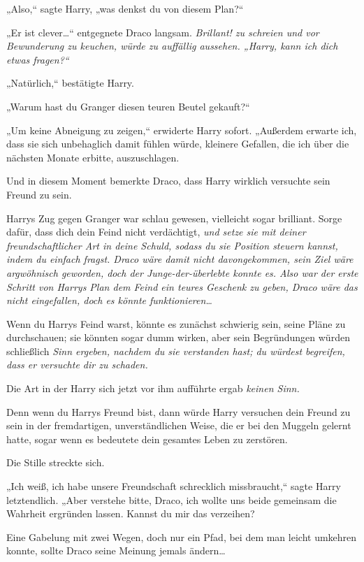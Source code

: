 {„Also,“ sagte Harry, „was denkst du von diesem Plan?“

„Er ist clever…“ entgegnete Draco langsam. \emph{Brillant! zu schreien und vor Bewunderung zu keuchen, würde zu auffällig aussehen. „Harry, kann ich dich etwas fragen?“}

„Natürlich,“ bestätigte Harry.

„Warum hast du Granger diesen teuren Beutel gekauft?“

„Um keine Abneigung zu zeigen,“ erwiderte Harry sofort. „Außerdem erwarte ich, dass sie sich unbehaglich damit fühlen würde, kleinere Gefallen, die ich über die nächsten Monate erbitte, auszuschlagen.

Und in diesem Moment bemerkte Draco, dass Harry wirklich versuchte sein Freund zu sein.

Harrys Zug gegen Granger war schlau gewesen, vielleicht sogar brilliant. Sorge dafür, dass dich dein Feind nicht verdächtigt, \emph{und setze sie mit deiner freundschaftlicher Art in deine Schuld, sodass du sie Position steuern kannst, indem du \emph{einfach fragst}. Draco wäre damit nicht davongekommen, sein Ziel wäre argwöhnisch geworden, doch der Junge-der-überlebte \emph{konnte} es. Also war der erste Schritt von Harrys Plan dem Feind ein teures Geschenk zu geben, Draco wäre das nicht eingefallen, doch es könnte \emph{funktionieren…}}

Wenn du Harrys Feind warst, könnte es zunächst schwierig sein, seine Pläne zu durchschauen; sie könnten sogar dumm wirken, aber sein Begründungen würden schließlich \emph{Sinn ergeben, nachdem du sie verstanden hast; du würdest begreifen, dass er versuchte dir zu schaden.}

Die Art in der Harry sich jetzt vor ihm aufführte ergab \emph{keinen Sinn.}

Denn wenn du Harrys Freund bist, dann würde Harry versuchen dein Freund zu sein in der fremdartigen, unverständlichen Weise, die er bei den Muggeln gelernt hatte, sogar wenn es bedeutete dein gesamtes Leben zu zerstören.

Die Stille streckte sich.

„Ich weiß, ich habe unsere Freundschaft schrecklich missbraucht,“ sagte Harry letztendlich. „Aber verstehe bitte, Draco, ich wollte uns beide gemeinsam die Wahrheit ergründen lassen. Kannst du mir das verzeihen?

Eine Gabelung mit zwei Wegen, doch nur ein Pfad, bei dem man leicht umkehren konnte, sollte Draco seine Meinung jemals ändern…

}
